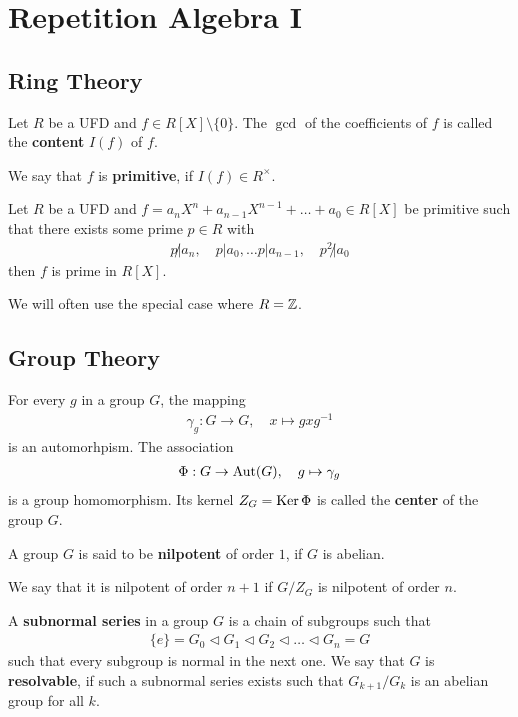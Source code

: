 \section{Repetition Algebra I}


\subsection{Ring Theory}

\begin{dfn}[]
  Let $R$ be a UFD and $f \in R[X] \setminus \{0\}$. The $\gcd$ of the coefficients of $f$ is called the \textbf{content} $I(f)$ of $f$.

  We say that $f$ is \textbf{primitive}, if $I(f) \in R^{\times}$.
\end{dfn}



\begin{thm}
  Let $R$ be a UFD and $f = a_nX^{n} + a_{n-1}X^{n-1} + \ldots + a_0 \in R[X]$ be primitive such that there exists some prime $p \in R$ with
  \begin{align*}
   p \not| a_n, \quad p|a_0, \ldots p|a_{n-1}, \quad p^{2}\not|a_0 
  \end{align*}
  then $f$ is prime in $R[X]$.
\end{thm}
We will often use the special case where $R = \mathbb{Z}$.

\subsection{Group Theory}
For every $g$ in a group $G$, the mapping
\begin{align*}
  \gamma_g: G \to G, \quad x \mapsto gxg^{-1}
\end{align*}
is an automorhpism. The association
\begin{align*}
  \Phi: G \to \operatorname{Aut}(G), \quad g \mapsto \gamma_g
\end{align*}
is a group homomorphism. Its kernel $Z_G = \operatorname{Ker} \Phi$ is called the \textbf{center} of the group $G$.
\begin{dfn}[]
A group $G$ is said to be \textbf{nilpotent} of order $1$, if $G$ is abelian.

We say that it is nilpotent of order $n+1$ if $G/Z_G$ is nilpotent of order $n$.
\end{dfn}
\begin{dfn}[]
A \textbf{subnormal series} in a group $G$ is a chain of subgroups such that
\begin{align*}
  \{e\} = G_0 \lhd G_1 \lhd G_2 \lhd  \ldots \lhd G_n = G
\end{align*}
such that every subgroup is normal in the next one.
We say that $G$ is \textbf{resolvable}, if such a subnormal series exists such that $G_{k+1}/G_k$ is an abelian group for all $k$.
\end{dfn}

